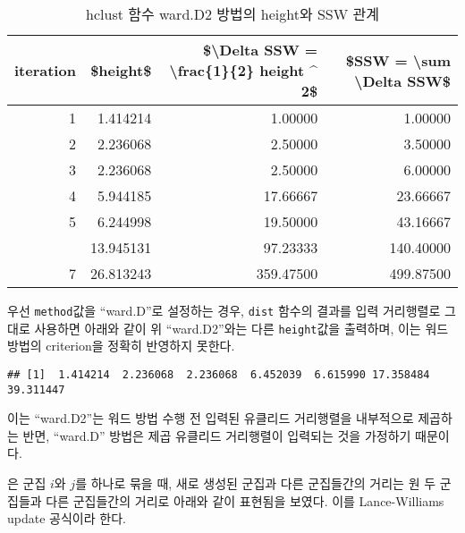 \documentclass[
]{book}
\newenvironment{Shaded}{\begin{snugshade}}{\end{snugshade}}
\newcommand{\AttributeTok}[1]{\textcolor[rgb]{0.77,0.63,0.00}{#1}}
\newcommand{\DecValTok}[1]{\textcolor[rgb]{0.00,0.00,0.81}{#1}}
\newcommand{\FunctionTok}[1]{\textcolor[rgb]{0.00,0.00,0.00}{#1}}
\newcommand{\NormalTok}[1]{#1}
\newcommand{\OtherTok}[1]{\textcolor[rgb]{0.56,0.35,0.01}{#1}}
\newcommand{\SpecialCharTok}[1]{\textcolor[rgb]{0.00,0.00,0.00}{#1}}
\newcommand{\StringTok}[1]{\textcolor[rgb]{0.31,0.60,0.02}{#1}}
\begin{document}
\begin{table}

\caption{\label{tab:ward-D2-height-ssw}hclust 함수 ward.D2 방법의 height와 SSW 관계}
\centering
\begin{tabular}[t]{rrrr}
\toprule
iteration & \$height\$ & \$\textbackslash{}Delta SSW = \textbackslash{}frac\{1\}\{2\} height \textasciicircum{} 2\$ & \$SSW = \textbackslash{}sum \textbackslash{}Delta SSW\$\\
\midrule
1 & 1.414214 & 1.00000 & 1.00000\\
2 & 2.236068 & 2.50000 & 3.50000\\
3 & 2.236068 & 2.50000 & 6.00000\\
4 & 5.944185 & 17.66667 & 23.66667\\
5 & 6.244998 & 19.50000 & 43.16667\\
\addlinespace
6 & 13.945131 & 97.23333 & 140.40000\\
7 & 26.813243 & 359.47500 & 499.87500\\
\bottomrule
\end{tabular}
\end{table}

우선 \texttt{method}값을 ``ward.D''로 설정하는 경우, \texttt{dist} 함수의 결과를 입력 거리행렬로 그대로 사용하면 아래와 같이 위 ``ward.D2''와는 다른 \texttt{height}값을 출력하며, 이는 워드 방법의 criterion을 정확히 반영하지 못한다.

\begin{Shaded}
\end{Shaded}

\begin{verbatim}
## [1]  1.414214  2.236068  2.236068  6.452039  6.615990 17.358484 39.311447
\end{verbatim}

이는 ``ward.D2''는 워드 방법 수행 전 입력된 유클리드 거리행렬을 내부적으로 제곱하는 반면, ``ward.D'' 방법은 제곱 유클리드 거리행렬이 입력되는 것을 가정하기 때문이다.

\citet{lance1967general} 은 군집 \(i\)와 \(j\)를 하나로 묶을 때, 새로 생성된 군집과 다른 군집들간의 거리는 원 두 군집들과 다른 군집들간의 거리로 아래와 같이 표현됨을 보였다. 이를 Lance-Williams update 공식이라 한다.
\end{document}
